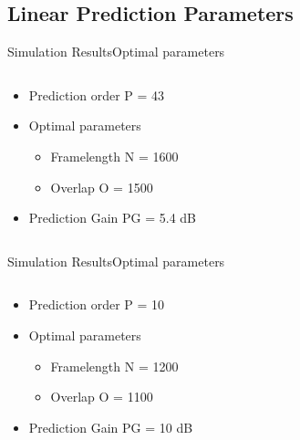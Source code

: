 \subsection{Linear Prediction Parameters}
\begin{frame}{Simulation Results}{Optimal parameters}		
\begin{columns}
	\begin{column}{0.4\textwidth}
		\begin{itemize}
			\item Prediction order P = 43
			\item Optimal parameters
			\begin{itemize}
				\item Framelength N = 1600
				\item Overlap O = 1500
			\end{itemize}
			\item Prediction Gain PG = 5.4 dB
		\end{itemize}
	\end{column}
	\begin{column}{0.6\textwidth} 
		\resizebox{0.9\columnwidth}{!}{		
			}
	\end{column}
\end{columns}
\end{frame}

\begin{frame}{Simulation Results}{Optimal parameters}		
\begin{columns}
	\begin{column}{0.4\textwidth}
	\begin{itemize}
		\item Prediction order P = 10
		\item Optimal parameters
		\begin{itemize}
			\item Framelength N = 1200
			\item Overlap O = 1100
		\end{itemize}
		\item Prediction Gain PG = 10 dB
	\end{itemize}
	\end{column}
	\begin{column}{0.6\textwidth} 
		\resizebox{0.9\columnwidth}{!}{		
			}
	\end{column}
\end{columns}
\end{frame}

